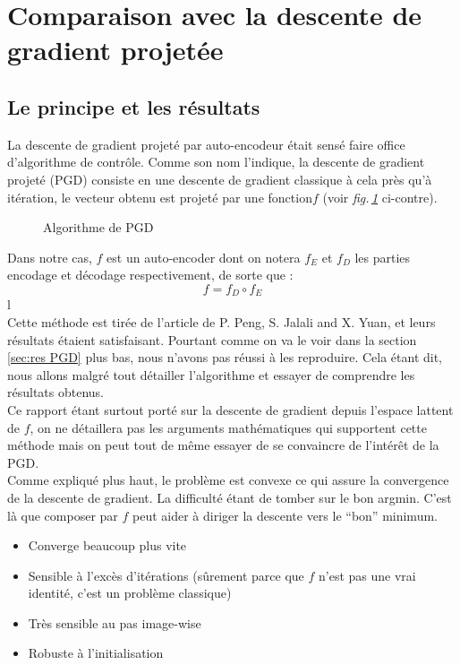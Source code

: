 \documentclass[hidelinks, french]{article} %
\newcommand{\figref}[1]{\textit{fig.\,\ref{#1}}}
\theoremstyle{enonce}
\theoremstyle{special}
\theoremstyle{rq}
\theoremstyle{exo}
\theoremstyle{demo}
\begin{document}
\newpage



\section{Comparaison avec la descente de gradient projetée}\label{sec:comparPGD}

\subsection{Le principe et les résultats}\label{sec:PGD}
\quad 

La descente de gradient projeté par auto-encodeur était sensé faire office d'algorithme de contrôle. Comme son nom l'indique, la descente de gradient projeté (PGD) consiste en une descente de gradient classique à cela près qu'à itération, le vecteur obtenu est projeté par une fonction$f$ (voir \figref{fig:pcode PGD} ci-contre). 

\begin{figure}
    
    \caption{Algorithme de PGD}
    \label{fig:pcode PGD}
\end{figure}
\noindent Dans notre cas, $f$ est un auto-encoder dont on notera $f_E$ et $f_D$ les parties encodage et décodage respectivement, de sorte que :
\[f = f_D\circ f_E\]{\color{white}l}
\\
Cette méthode est tirée de l'article \cite{peng_solving_2019} de P. Peng, S. Jalali and X. Yuan, et leurs résultats étaient satisfaisant. Pourtant comme on va le voir dans la section \ref{sec:res PGD} plus bas, nous n'avons pas réussi à les reproduire.
Cela étant dit, nous allons malgré tout détailler l'algorithme et essayer de comprendre les résultats obtenus.
\\
Ce rapport étant surtout porté sur la descente de gradient depuis l'espace lattent de $f$, on ne détaillera pas les arguments mathématiques qui supportent cette méthode mais on peut tout de même essayer de se convaincre de l'intérêt de la PGD.\\
Comme expliqué plus haut, le problème est convexe ce qui assure la convergence de la descente de gradient. La difficulté étant de tomber sur le bon argmin. C'est là que composer par $f$ peut aider à diriger la descente vers le ``bon'' minimum.


\begin{itemize}
	\item Converge beaucoup plus vite
	\item Sensible à l'excès d'itérations (sûrement parce que $f$ n'est pas une vrai identité, c'est un problème classique)
	\item Très sensible au pas image-wise
	\item Robuste à l'initialisation
\end{itemize}
\end{document}
